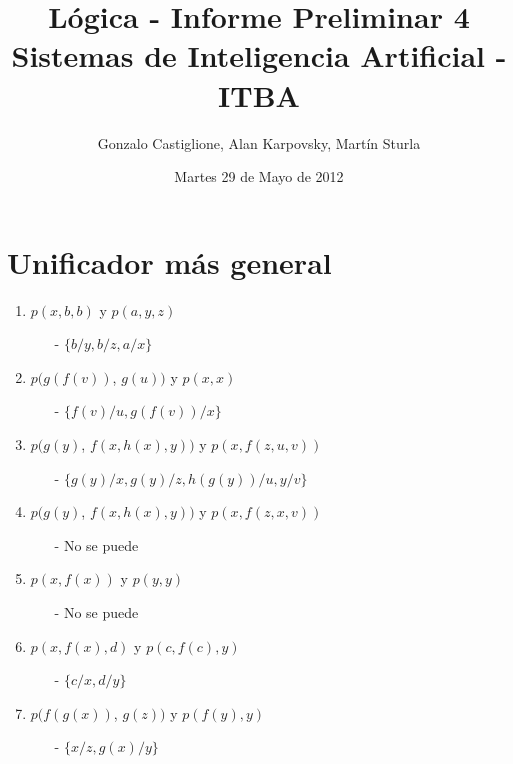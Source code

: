 \documentclass[12pt]{article} %
\title{Lógica - Informe Preliminar 4\\\large{Sistemas de Inteligencia Artificial - ITBA}}
\author{Gonzalo Castiglione, Alan Karpovsky, Martín Sturla}
\date{Martes 29 de Mayo de 2012} %
\begin{document}
\maketitle

\tableofcontents
\clearpage

\section{Unificador más general}
\begin{enumerate}
\item $p(x, b, b)$ y $p(a, y, z)$
	\begin{itemize}
	\item[-] $\{b/y, b/z, a/x\}$
	\end{itemize}

\item $p(g(f(v))$, $g(u))$ y $p(x, x)$
	\begin{itemize}
	\item[-] $\{f(v)/u, g(f(v))/x\}$
	\end{itemize}

\item $p(g(y)$, $f(x, h(x), y))$ y $p(x, f(z, u, v))$
	\begin{itemize}
	\item[-] $\{  g(y)/x, g(y)/z, h(g(y))/u,  y/v  \}$
	\end{itemize}

\item $p(g(y)$, $f(x, h(x), y))$ y $p(x, f(z, x, v))$
	\begin{itemize}
	\item[-] No se puede
	\end{itemize}

\item $p(x, f(x))$ y $p(y, y)$
	\begin{itemize}
	\item[-] No se puede
	\end{itemize}

\item $p(x, f(x), d)$ y $p(c, f(c), y)$
	\begin{itemize}
	\item[-] $\{ c/x, d/y  \}$
	\end{itemize}

\item $p(f(g(x))$, $g(z))$ y $p(f(y), y)$
	\begin{itemize}
	\item[-] $\{ x/z, g(x)/y  \}$
	\end{itemize}


\end{enumerate}
\end{document}
